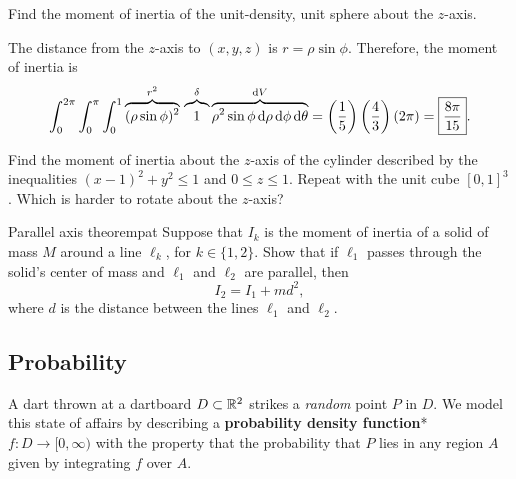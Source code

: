 \documentclass{watsonbook}
\begin{document}
\begin{example}{}{}
  Find the moment of inertia of the unit-density, unit sphere about the $z$-axis. 
\end{example}

\begin{solution}
  The distance from the $z$-axis to $(x,y,z)$ is $r = \rho \sin \phi$. Therefore, the moment of inertia is
  \[
    \int_{0}^{2\pi}\int_0^\pi \int_0^1 \overbrace{(\rho \sin \phi)^2}^{r^2} \,
    \overbrace{\vphantom{\rho^2} 1}^{\delta}\overbrace{\rho^2 \sin \phi \, \mathrm{d}\rho \, \mathrm{d}\phi \, \mathrm{d}\theta}^{\mathrm{d} V} = \left(\frac{1}{5}\right) \left(\frac{4}{3}\right) \left(2\pi\right) = \boxed{\frac{8\pi}{15}}. 
  \]
\end{solution}

\begin{exercise}{}{}
  Find the moment of inertia about the $z$-axis of the cylinder described by the inequalities $(x-1)^2 + y^2 \leq 1$ and $0 \leq z \leq 1$. Repeat with the unit cube $[0,1]^3$. Which is harder to rotate about the $z$-axis? 
\end{exercise}

\begin{exercise}{Parallel axis theorem}{pat}
  Suppose that $I_k$ is the moment of inertia of a solid of mass $M$ around a line $\ell_k$, for $k\in \{1,2\}$. Show that if $\ell_1$ passes through the solid's center of mass and $\ell_1$ and $\ell_2$ are parallel, then
  \[
    I_2 = I_1 + md^2,
  \]
  where $d$ is the distance between the lines $\ell_1$ and $\ell_2$. 
\end{exercise}

\subsection{Probability}

A dart thrown at a dartboard $D\subset \mathbb{R}^2$ strikes a \textit{random}
point $P$ in $D$. We model this state of affairs by describing a
\textbf{probability density function}* $f:D \to [0,\infty)$ with the
property that the probability that $P$ lies in any region $A$ given by
integrating $f$ over $A$. 
\end{document}

